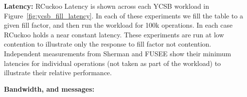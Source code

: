 \textbf{Latency:} RCuckoo Latency is shown across each YCSB
workload in Figure~\ref{fig:ycsb_fill_latency}. In each of
these experiments we fill the table to a given fill factor,
and then run the workload for 100k operations. In each case
RCuckoo holds a near constant latency. These experiments are
run at low contention to illustrate only the response to
fill factor not contention. Independent measurements from
Sherman and FUSEE show their minimum latencies for
individual operations (not taken as part of the workload) to
illustrate their relative performance.


\textbf{Bandwidth, and messages:} 

